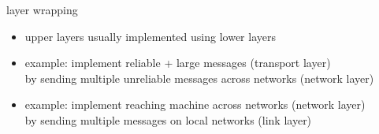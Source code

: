 \begin{frame}{layer wrapping}
    \begin{itemize}
    \item upper layers usually implemented using lower layers
    \vspace{.5cm}
    \item example: implement reliable + large messages (transport layer) \\
        by sending multiple unreliable messages across networks (network layer)
    \item example: implement reaching machine across networks (network layer) \\
        by sending multiple messages on local networks (link layer)
    \end{itemize}
\end{frame}
